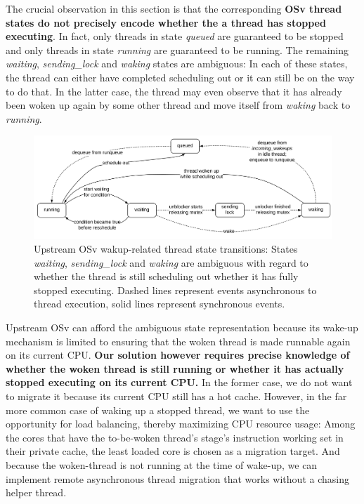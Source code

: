 \documentclass[12pt,a4paper]{book}
\begin{document}
The crucial observation in this section is that the corresponding \textbf{OSv thread states do not precisely encode whether the a thread has stopped executing}.
In fact, only threads in state \textit{queued} are guaranteed to be stopped and only threads in state \textit{running} are guaranteed to be running.
The remaining \textit{waiting}, \textit{sending\_lock} and \textit{waking} states are ambiguous:
In each of these states, the thread can either have completed scheduling out or it can still be on the way to do that.
In the latter case, the thread may even observe that it has already been woken up again by some other thread and move itself from \textit{waking} back to \textit{running}.

\begin{figure}
    \centering
    \includegraphics[width=\textwidth]{fig_build/state_chart_pre_spread}
    \caption{Upstream OSv wakup-related thread state transitions: States \textit{waiting}, \textit{sending\_lock} and \textit{waking} are ambiguous with regard to whether the thread is still scheduling out whether it has fully stopped executing.
    Dashed lines represent events asynchronous to thread execution, solid lines represent synchronous events.}
    \label{fig:di:wake:upstreamstates}
\end{figure}

Upstream OSv can afford the ambiguous state representation because its wake-up mechanism is limited to ensuring that the woken thread is made runnable again on its current CPU.
\textbf{Our solution however requires precise knowledge of whether the woken thread is still running or whether it has actually stopped executing on its current CPU.}
In the former case, we do not want to migrate it because its current CPU still has a hot cache.
However, in the far more common case of waking up a stopped thread, we want to use the opportunity for load balancing, thereby maximizing CPU resource usage:
Among the cores that have the to-be-woken thread's stage's instruction working set in their private cache, the least loaded core is chosen as a migration target.
And because the woken-thread is not running at the time of wake-up, we can implement remote asynchronous thread migration that works without a chasing helper thread.
\end{document}
